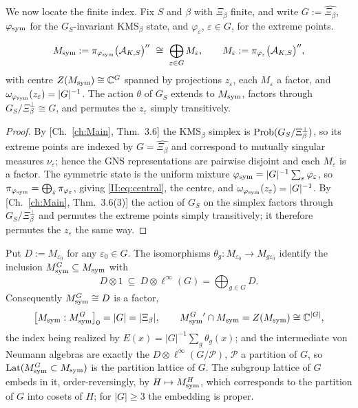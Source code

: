 We now locate the finite index. Fix $S$ and $\beta$ with $\Xi_\beta$ finite, and write
$G:=\widehat{\Xi_\beta}$, $\varphi_{\mathrm{sym}}$ for the $G_S$-invariant $\mathrm{KMS}_\beta$ state, and
$\varphi_\varepsilon$, $\varepsilon\in G$, for the extreme points.

\begin{lemma}\label{II:lem:central}
\begin{equation}\label{II:eq:central}
\Msym:=\pi_{\phisym}\bigl(\cA_{K,S}\bigr)''\ \cong\ \bigoplus_{\varepsilon\in G}M_\varepsilon,
\qquad M_\varepsilon:=\pi_{\varphi_\varepsilon}\bigl(\cA_{K,S}\bigr)'' ,
\end{equation}
with centre $Z(M_{\mathrm{sym}})\cong\mathbb{C}^{G}$ spanned by projections $z_\varepsilon$, each
$M_\varepsilon$ a factor, and $\omega_{\varphi_{\mathrm{sym}}}(z_\varepsilon)=|G|^{-1}$. The action
$\theta$ of $G_S$ extends to $M_{\mathrm{sym}}$, factors through
$G_S/\Xi_\beta^\perp\cong G$, and permutes the $z_\varepsilon$ simply transitively.
\end{lemma}

\begin{proof}
By [Ch.~\ref{ch:Main}, Thm.~3.6] the $\mathrm{KMS}_\beta$ simplex is $\mathrm{Prob}(G_S/\Xi_\beta^\perp)$,
so its extreme points are indexed by $G=\widehat{\Xi_\beta}$ and correspond to mutually
singular measures $\nu_\varepsilon$; hence the GNS representations are pairwise disjoint and
each $M_\varepsilon$ is a factor. The symmetric state is the uniform mixture
$\varphi_{\mathrm{sym}}=|G|^{-1}\sum_\varepsilon\varphi_\varepsilon$, so
$\pi_{\varphi_{\mathrm{sym}}}=\bigoplus_\varepsilon\pi_{\varphi_\varepsilon}$, giving \eqref{II:eq:central},
the centre, and $\omega_{\varphi_{\mathrm{sym}}}(z_\varepsilon)=|G|^{-1}$. By [Ch.~\ref{ch:Main}, Thm.~3.6(3)] the
action of $G_S$ on the simplex factors through $G_S/\Xi_\beta^\perp$ and permutes the
extreme points simply transitively; it therefore permutes the $z_\varepsilon$ the same way.
\end{proof}

\begin{theorem}\label{II:thm:finite}
Put $D:=M_{\varepsilon_0}$ for any $\varepsilon_0\in G$. The isomorphisms
$\theta_g:M_{\varepsilon_0}\to M_{g\varepsilon_0}$ identify the inclusion
$M_{\mathrm{sym}}^{G}\subseteq M_{\mathrm{sym}}$ with
\begin{equation}\label{II:eq:trivialincl}
D\otimes1\ \subseteq\ D\otimes\ell^\infty(G)=\bigoplus_{g\in G}D .
\end{equation}
Consequently $M_{\mathrm{sym}}^G\cong D$ is a factor,
\begin{equation}\label{II:eq:index}
\bigl[M_{\mathrm{sym}}:M_{\mathrm{sym}}^{G}\bigr]_0=|G|=|\Xi_\beta|,
\qquad
M_{\mathrm{sym}}^{G}{}'\cap M_{\mathrm{sym}}=Z(M_{\mathrm{sym}})\cong\mathbb{C}^{|G|},
\end{equation}
the index being realized by $E(x)=|G|^{-1}\sum_{g}\theta_g(x)$; and the intermediate von
Neumann algebras are exactly the $D\otimes\ell^\infty(G/\mathcal P)$, $\mathcal P$ a
partition of $G$, so $\operatorname{Lat}(M_{\mathrm{sym}}^G\subset M_{\mathrm{sym}})$ is the partition lattice of $G$. The
subgroup lattice of $G$ embeds in it, order-reversingly, by $H\mapsto M_{\mathrm{sym}}^H$, which
corresponds to the partition of $G$ into cosets of $H$; for $|G|\ge3$ the embedding is
proper.
\end{theorem}

